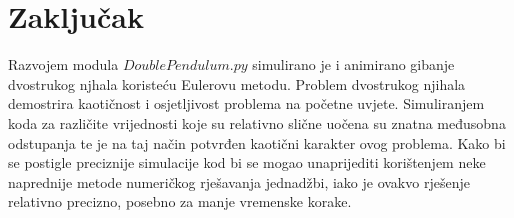 \documentclass[a4paper,12pt]{article}
\begin{document}
\section{Zaključak}

Razvojem modula $DoublePendulum.py$ simulirano je i animirano gibanje dvostrukog njhala koristeću Eulerovu metodu. Problem dvostrukog njihala demostrira kaotičnost i osjetljivost problema na početne uvjete. Simuliranjem koda za različite vrijednosti koje su relativno slične uočena su znatna međusobna odstupanja te je na taj način potvrđen kaotični karakter ovog problema. Kako bi se postigle preciznije simulacije kod bi se mogao unaprijediti korištenjem neke naprednije metode numeričkog rješavanja jednadžbi, iako je ovakvo rješenje relativno precizno, posebno za manje vremenske korake. 


\begin{thebibliography}{9}


\end{thebibliography}
\end{document}
